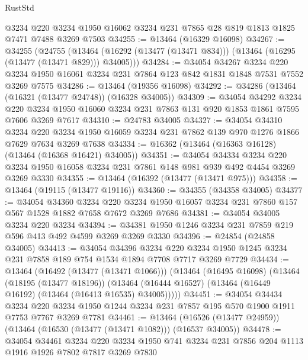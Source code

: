 \begin{lexlean}{RustStd}
\begin{coremodule}
    @3234
    @220
    @3234
    @1950
    @16062
    @3234
    @231
    @7865
    @28
    @819
    @1813
    @1825
    @7471
    @7488
    @3269
    @7503
@34255 := @13464 (@16329 @16098)
@34267 := @34255
    (@24755
      (@13464 (@16292 (@13477 (@13471 @834))) (@13464 (@16295 (@13477 (@13471 @829))) @34005)))
@34284 := @34054
    @34267
    @3234
    @220
    @3234
    @1950
    @16061
    @3234
    @231
    @7864
    @123
    @842
    @1831
    @1848
    @7531
    @7552
    @3269
    @7575
@34286 := @13464 (@19356 @16098)
@34292 := @34286 (@13464 (@16321 (@13477 @24748)) (@16328 @34005))
@34309 := @34054
    @34292
    @3234
    @220
    @3234
    @1950
    @16060
    @3234
    @231
    @7863
    @131
    @920
    @1853
    @1861
    @7595
    @7606
    @3269
    @7617
@34310 := @24783 @34005
@34327 := @34054
    @34310
    @3234
    @220
    @3234
    @1950
    @16059
    @3234
    @231
    @7862
    @139
    @970
    @1276
    @1866
    @7629
    @7634
    @3269
    @7638
@34334 := @16362 (@13464 (@16363 @16128) (@13464 (@16368 @16421) @34005))
@34351 := @34054
    @34334
    @3234
    @220
    @3234
    @1950
    @16058
    @3234
    @231
    @7861
    @148
    @981
    @939
    @492
    @4454
    @3269
    @3269
    @3330
@34355 := @13464 (@16392 (@13477 (@13471 @975)))
@34358 := @13464 (@19115 (@13477 @19116))
@34360 := @34355 (@34358 @34005)
@34377 := @34054
    @34360
    @3234
    @220
    @3234
    @1950
    @16057
    @3234
    @231
    @7860
    @157
    @567
    @1528
    @1882
    @7658
    @7672
    @3269
    @7686
@34381 := @34054 @34005 @3234 @220 @3234
@34394 := @34381 @1950 @1246 @3234 @231 @7859 @219 @596 @413 @492 @4599 @3269 @3269 @3330
@34396 := @24854 (@24858 @34005)
@34413 := @34054
    @34396
    @3234
    @220
    @3234
    @1950
    @1245
    @3234
    @231
    @7858
    @189
    @754
    @1534
    @1894
    @7708
    @7717
    @3269
    @7729
@34434 := @13464
    (@16492 (@13477 (@13471 @1066)))
    (@13464
      (@16495 @16098)
      (@13464
        (@18195 (@13477 @18196))
        (@13464 (@16444 @16527) (@13464 (@16449 @16192) (@13464 (@16413 @16535) @34005)))))
@34451 := @34054
    @34434
    @3234
    @220
    @3234
    @1950
    @1244
    @3234
    @231
    @7857
    @195
    @570
    @1900
    @1911
    @7753
    @7767
    @3269
    @7781
@34461 := @13464 (@16526 (@13477 @24959)) (@13464 (@16530 (@13477 (@13471 @1082))) (@16537 @34005))
@34478 := @34054
    @34461
    @3234
    @220
    @3234
    @1950
    @741
    @3234
    @231
    @7856
    @204
    @1113
    @1916
    @1926
    @7802
    @7817
    @3269
    @7830

\end{coremodule}
\end{lexlean}
